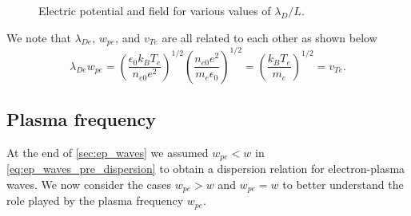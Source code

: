 \documentclass[a4paper,11pt]{report}
\begin{document}
\begin{figure}
\begin{subfigure}[b]{0.45\textwidth}
        \caption{}
        \label{fig:debye_elec}
    \end{subfigure}
    \caption{Electric potential and field for various values of $\lambda_D/L$.}
    \label{fig:debye_phi_elec}
\end{figure}

We note that $\lambda_{De}$,  $w_{pe}$, and $v_{Te}$ are all related to each other as shown below
\begin{equation}
    \label{eq:debye_3vars}
    \lambda_{De} w_{pe} = \left ( \frac{\epsilon_0 k_B T_e}{n_{e0} e^2} \right )^{1/2} \left ( \frac{n_{e0} e^2}{m_e \epsilon_0} \right )^{1/2} = \left ( \frac{k_B T_e}{m_e} \right )^{1/2} = v_{Te}.
\end{equation}

\subsection{Plasma frequency}
At the end of \cref{sec:ep_waves} we assumed $w_{pe} < w$ in \cref{eq:ep_waves_pre_dispersion} to obtain a dispersion relation for electron-plasma waves. We now consider the cases $w_{pe} > w$ and $w_{pe} = w$ to better understand the role played by the plasma frequency $w_{pe}$.
\end{document}
